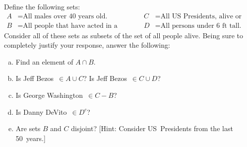 \documentclass[11pt,letterpaper]{article}
\begin{document}
\newpage



 Define the following sets:
	\[
	\begin{aligned}
	A&= \text{All males over 40~years old.} & & & C&= \text{All US Presidents, alive or dead.} \\
	B&= \text{All people that have acted in a movie.} & & & D&= \text{All persons under 6~ft tall.} 
	\end{aligned}
	\]
Consider all of these sets as subsets of the set of all people alive. Being sure to completely justify your response, answer the following:
	\begin{enumerate}[(a)]
	\item Find an element of $A \cap B$. 
	\item Is Jeff Bezos~$\in A \cup C$? Is Jeff Bezos~$\in C \cup D$?
	\item Is George Washington~$\in C - B$?
	\item Is Danny DeVito~$\in D^c$?
	\item Are sets $B$ and $C$ disjoint? [Hint: Consider US~Presidents from the last 50~years.]
	\end{enumerate} \pspace
\end{document}
